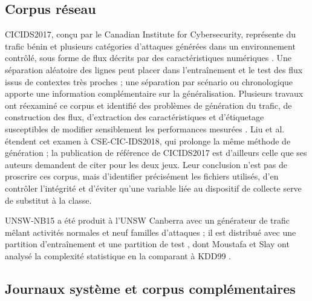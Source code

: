 \subsection{Corpus réseau}

CICIDS2017, conçu par le Canadian Institute for Cybersecurity, représente du trafic bénin et plusieurs catégories d'attaques générées dans un environnement contrôlé, sous forme de flux décrits par des caractéristiques numériques \cite{sharafaldin2018cicids}. Une séparation aléatoire des lignes peut placer dans l'entraînement et le test des flux issus de contextes très proches ; une séparation par scénario ou chronologique apporte une information complémentaire sur la généralisation. Plusieurs travaux ont réexaminé ce corpus et identifié des problèmes de génération du trafic, de construction des flux, d'extraction des caractéristiques et d'étiquetage susceptibles de modifier sensiblement les performances mesurées \cite{engelen2021troubleshooting,lanvin2023errors}. Liu et al. étendent cet examen à CSE-CIC-IDS2018, qui prolonge la même méthode de génération \cite{liu2022error,cic2018csecicids} ; la publication de référence de CICIDS2017 est d'ailleurs celle que ses auteurs demandent de citer pour les deux jeux. Leur conclusion n'est pas de proscrire ces corpus, mais d'identifier précisément les fichiers utilisés, d'en contrôler l'intégrité et d'éviter qu'une variable liée au dispositif de collecte serve de substitut à la classe.

UNSW-NB15 a été produit à l'UNSW Canberra avec un générateur de trafic mêlant activités normales et neuf familles d'attaques ; il est distribué avec une partition d'entraînement et une partition de test \cite{moustafa2015unsw}, dont Moustafa et Slay ont analysé la complexité statistique en la comparant à KDD99 \cite{moustafa2016evaluation}.

\subsection{Journaux système et corpus complémentaires}


